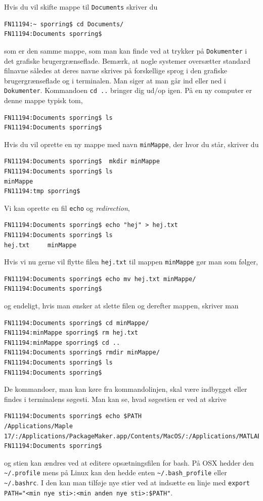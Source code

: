 \documentclass[a4paper]{article}
\begin{document}
Hvis du vil skifte mappe til \verb|Documents| skriver du
\begin{lstlisting}[frame=single]
FN11194:~ sporring$ cd Documents/
FN11194:Documents sporring$ 
\end{lstlisting}
som er den samme mappe, som man kan finde ved at trykker på \verb|Dokumenter| i det grafiske brugergrænseflade. Bemærk, at nogle systemer oversætter standard filnavne således at deres navne skrives på forskellige sprog i den grafiske brugergrænseflade og i terminalen. Man siger at man går ind eller ned i \verb|Dokumenter|. Kommandoen \verb|cd ..| bringer dig ud/op igen. På en ny computer er denne mappe typisk tom,
\begin{lstlisting}[frame=single]
FN11194:Documents sporring$ ls
FN11194:Documents sporring$  
\end{lstlisting}
Hvis du vil oprette en ny mappe med navn \verb|minMappe|, der hvor du står, skriver du
\begin{lstlisting}[frame=single]
FN11194:Documents sporring$  mkdir minMappe
FN11194:Documents sporring$ ls
minMappe
FN11194:tmp sporring$  
\end{lstlisting}
Vi kan oprette en fil \verb|echo| og \textit{redirection},
\begin{lstlisting}[frame=single]
FN11194:Documents sporring$ echo "hej" > hej.txt
FN11194:Documents sporring$ ls
hej.txt		minMappe
\end{lstlisting}
Hvis vi nu gerne vil flytte filen \verb|hej.txt| til mappen \verb|minMappe| gør man som følger,
\begin{lstlisting}[frame=single]
FN11194:Documents sporring$ echo mv hej.txt minMappe/
FN11194:Documents sporring$ 
\end{lstlisting}
og endeligt, hvis man ønsker at slette filen og derefter mappen, skriver man
\begin{lstlisting}[frame=single]
FN11194:Documents sporring$ cd minMappe/
FN11194:minMappe sporring$ rm hej.txt 
FN11194:minMappe sporring$ cd ..
FN11194:Documents sporring$ rmdir minMappe/
FN11194:Documents sporring$ ls
FN11194:Documents sporring$ 
\end{lstlisting}
De kommandoer, man kan køre fra kommandolinjen, skal være indbygget eller findes i terminalens søgesti. Man kan se, hvad søgestien er ved at skrive
\begin{lstlisting}[frame=single]
FN11194:Documents sporring$ echo $PATH
/Applications/Maple 17/:/Applications/PackageMaker.app/Contents/MacOS/:/Applications/MATLAB_R2014b.app/bin/:/opt/local/bin:/opt/local/sbin:/usr/local/bin:/usr/bin:/bin:/usr/sbin:/sbin:/opt/X11/bin:/Library/TeX/texbin
FN11194:Documents sporring$ 
\end{lstlisting}
og stien kan ændres ved at editere opsætningsfilen for bash. På OSX hedder den \verb|~/.profile| mens på Linux kan den hedde enten \verb|~/.bash_profile| eller \verb|~/.bashrc|. I den kan man tilføje nye stier ved at indsætte en linje med \verb|export PATH="<min nye sti>:<min anden nye sti>:$PATH"|.
\end{document}

